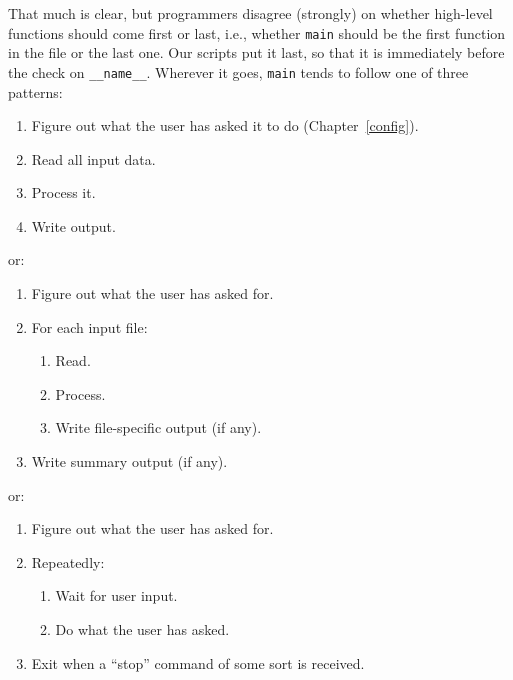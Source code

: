 \documentclass[
]{krantz}
\providecommand{\tightlist}{%
  \setlength{\itemsep}{0pt}\setlength{\parskip}{0pt}}
\begin{document}
That much is clear,
but programmers disagree (strongly) on whether high-level functions should come first or last,
i.e.,
whether \texttt{main} should be the first function in the file or the last one.
Our scripts put it last,
so that it is immediately before the check on \texttt{\_\_name\_\_}.
Wherever it goes,
\texttt{main} tends to follow one of three patterns:

\begin{enumerate}
\def\labelenumi{\arabic{enumi}.}
\tightlist
\item
  Figure out what the user has asked it to do (Chapter~\ref{config}).
\item
  Read all input data.
\item
  Process it.
\item
  Write output.
\end{enumerate}

or:

\begin{enumerate}
\def\labelenumi{\arabic{enumi}.}
\tightlist
\item
  Figure out what the user has asked for.
\item
  For each input file:

  \begin{enumerate}
  \def\labelenumii{\arabic{enumii}.}
  \tightlist
  \item
    Read.
  \item
    Process.
  \item
    Write file-specific output (if any).
  \end{enumerate}
\item
  Write summary output (if any).
\end{enumerate}

or:

\begin{enumerate}
\def\labelenumi{\arabic{enumi}.}
\tightlist
\item
  Figure out what the user has asked for.
\item
  Repeatedly:

  \begin{enumerate}
  \def\labelenumii{\arabic{enumii}.}
  \tightlist
  \item
    Wait for user input.
  \item
    Do what the user has asked.
  \end{enumerate}
\item
  Exit when a ``stop'' command of some sort is received.
\end{enumerate}
\end{document}
